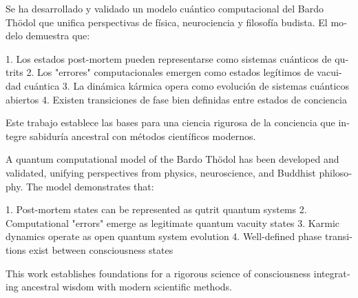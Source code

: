 \documentclass[12pt,a4paper]{article}
\begin{document}
\begin{otherlanguage}{spanish}
Se ha desarrollado y validado un modelo cuántico computacional del Bardo Thödol que unifica perspectivas de física, neurociencia y filosofía budista. El modelo demuestra que:

1. Los estados post-mortem pueden representarse como sistemas cuánticos de qutrits
2. Los "errores" computacionales emergen como estados legítimos de vacuidad cuántica
3. La dinámica kármica opera como evolución de sistemas cuánticos abiertos
4. Existen transiciones de fase bien definidas entre estados de conciencia

Este trabajo establece las bases para una ciencia rigurosa de la conciencia que integre sabiduría ancestral con métodos científicos modernos.
\end{otherlanguage}

\begin{otherlanguage}{english}
A quantum computational model of the Bardo Thödol has been developed and validated, unifying perspectives from physics, neuroscience, and Buddhist philosophy. The model demonstrates that:

1. Post-mortem states can be represented as qutrit quantum systems
2. Computational "errors" emerge as legitimate quantum vacuity states
3. Karmic dynamics operate as open quantum system evolution
4. Well-defined phase transitions exist between consciousness states

This work establishes foundations for a rigorous science of consciousness integrating ancestral wisdom with modern scientific methods.
\end{otherlanguage}

\printbibliography
\end{document}
